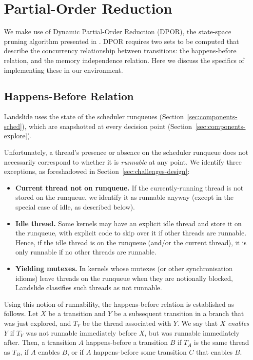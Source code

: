 \section{Partial-Order Reduction}
\label{sec:techniques-por}

We make use of Dynamic Partial-Order Reduction (DPOR), the state-space pruning algorithm presented in \cite{dpor}. DPOR requires two sets to be computed that describe the concurrency relationship between transitions: the happens-before relation, and the memory independence relation. Here we discuss the specifics of implementing these in our environment.

\subsection{Happens-Before Relation}

 Landslide uses the state of the scheduler runqueues (Section~\ref{sec:components-sched}), which are snapshotted at every decision point (Section~\ref{sec:components-explore}).

Unfortunately, a thread's presence or absence on the scheduler runqueue does not necessarily correspond to whether it is {\em runnable} at any point. We identify three exceptions, as foreshadowed in Section~\ref{sec:challenges-design}:

\begin{itemize}
	\item {\bf Current thread not on runqueue.} If the currently-running thread is not stored on the runqueue, we identify it as runnable anyway (except in the special case of idle, as described below).
	\item {\bf Idle thread.} Some kernels may have an explicit idle thread and store it on the runqueue, with explicit code to skip over it if other threads are runnable. Hence, if the idle thread is on the runqueue (and/or the current thread), it is only runnable if no other threads are runnable.
	\item {\bf Yielding mutexes.} In kernels whose mutexes (or other synchronisation idioms) leave threads on the runqueue when they are notionally blocked, Landslide classifies such threads as not runnable.
\end{itemize}

Using this notion of runnability, the happens-before relation is established as follows. Let $X$ be a transition and $Y$ be a subsequent transition in a branch that was just explored, and $T_Y$ be the thread associated with $Y$. We say that $X$ {\em enables} $Y$ if $T_Y$ was not runnable immediately before $X$, but was runnable immediately after. Then, a transition $A$ happens-before a transition $B$ if $T_A$ is the same thread as $T_B$, if $A$ enables $B$, or if $A$ happens-before some transition $C$ that enables $B$.


